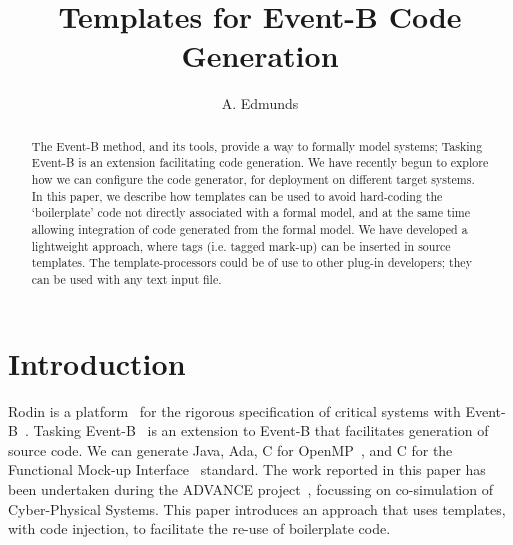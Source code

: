 \documentclass{llncs}%
\begin{document}
%
\title{Templates for Event-B Code Generation}

\author{A. Edmunds}


\maketitle
%
\begin{abstract}
The Event-B method, and  its tools, provide a way to formally model systems; Tasking Event-B is an extension facilitating code generation.  We have recently begun to explore how we can configure the code generator, for deployment on different target systems. In this paper, we describe how templates can be used to avoid hard-coding the `boilerplate' code not directly associated with a formal model, and at the same time allowing integration of code generated from the formal model. We have developed a lightweight approach, where tags (i.e. tagged mark-up) can be inserted in source templates. The template-processors could be of use to other plug-in developers; they can be used with any text input file. 
 \end{abstract}
%
%
\section{Introduction}
%
Rodin is a platform~\cite{abrial10rodin} for the rigorous specification of critical systems with Event-B~\cite{ABR10}. Tasking Event-B~\cite{Edmunds2009,Edmunds2008,ae2011a,ae2012b} is an extension to Event-B that facilitates generation of source code. We can generate Java, Ada, C for OpenMP~\cite{openmp}, and C for the Functional Mock-up Interface~\cite{FMISTD} standard. The work reported in this paper has been undertaken during the ADVANCE project~\cite{advance}, focussing on co-simulation of Cyber-Physical Systems. This paper introduces an approach that uses templates, with code injection, to facilitate the re-use of boilerplate code.
\end{document}
